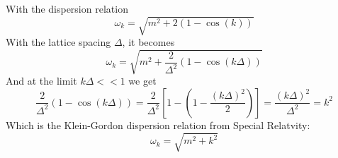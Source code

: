 \documentclass{article}
\begin{document}
With the dispersion relation
\begin{equation}
    \omega_k = \sqrt{m^2 + 2(1-\cos(k))}
\end{equation}
With the lattice spacing $\Delta$, it becomes
\begin{equation}
    \omega_k = \sqrt{m^2 + \frac{2}{\Delta^2}(1-\cos(k\Delta))}
\end{equation}
And at the limit $k\Delta << 1$ we get
\begin{equation}
    \frac{2}{\Delta^2}(1-\cos(k\Delta)) =
    \frac{2}{\Delta^2}\left[1 - (1 - \frac{(k\Delta)^2}{2})\right] =
    \frac{(k\Delta)^2}{\Delta^2} = k^2
\end{equation}
Which is the Klein-Gordon dispersion relation from Special Relatvity:
\begin{equation}
    \omega_k = \sqrt{m^2 + k^2}
\end{equation}
\end{document}
